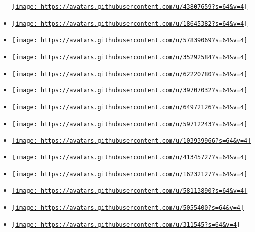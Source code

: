 \begin{itemize}
  \href{https://github.com/Liamolucko}{\texttt{[image: https://avatars.githubusercontent.com/u/43807659?s=64\&v=4]}}
\item
  \href{https://github.com/LingMan}{\texttt{[image: https://avatars.githubusercontent.com/u/18645382?s=64\&v=4]}}
\item
  \href{https://github.com/MDLC01}{\texttt{[image: https://avatars.githubusercontent.com/u/57839069?s=64\&v=4]}}
\item
  \href{https://github.com/Myriad-Dreamin}{\texttt{[image: https://avatars.githubusercontent.com/u/35292584?s=64\&v=4]}}
\item
  \href{https://github.com/StrangeGirlMurph}{\texttt{[image: https://avatars.githubusercontent.com/u/62220780?s=64\&v=4]}}
\item
  \href{https://github.com/T0mstone}{\texttt{[image: https://avatars.githubusercontent.com/u/39707032?s=64\&v=4]}}
\item
  \href{https://github.com/TheLukeGuy}{\texttt{[image: https://avatars.githubusercontent.com/u/64972126?s=64\&v=4]}}
\item
  \href{https://github.com/antonWetzel}{\texttt{[image: https://avatars.githubusercontent.com/u/59712243?s=64\&v=4]}}
\item
  \href{https://github.com/epbuennig}{\texttt{[image: https://avatars.githubusercontent.com/u/103939966?s=64\&v=4]}}
\item
  \href{https://github.com/kg583}{\texttt{[image: https://avatars.githubusercontent.com/u/41345727?s=64\&v=4]}}
\item
  \href{https://github.com/lynn}{\texttt{[image: https://avatars.githubusercontent.com/u/16232127?s=64\&v=4]}}
\item
  \href{https://github.com/mattfbacon}{\texttt{[image: https://avatars.githubusercontent.com/u/58113890?s=64\&v=4]}}
\item
  \href{https://github.com/mavaddat}{\texttt{[image: https://avatars.githubusercontent.com/u/5055400?s=64\&v=4]}}
\item
  \href{https://github.com/neunenak}{\texttt{[image: https://avatars.githubusercontent.com/u/311545?s=64\&v=4]}}

\end{itemize}
